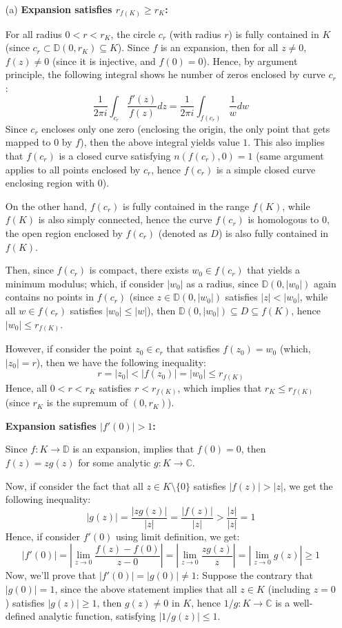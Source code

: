 \documentclass{article}
\begin{document}
\begin{itemize}
    \item[(a)] \textbf{Expansion satisfies $r_{f(K)}\geq r_K$:}
    
    For all radius $0<r<r_K$, the circle $c_r$ (with radius $r$) is fully contained in $K$ (since $c_r\subset \mathbb{D}(0,r_K)\subseteq K$).
    Since $f$ is an expansion, then for all $z\neq 0$, $f(z)\neq 0$ (since it is injective, and $f(0)=0$). Hence, by argument principle,
    the following integral shows he number of zeros enclosed by curve $c_r$:
    $$\frac{1}{2\pi i}\int_{c_r}\frac{f'(z)}{f(z)}dz = \frac{1}{2\pi i}\int_{f(c_r)}\frac{1}{w}dw$$
    Since $c_r$ encloses only one zero (enclosing the origin, the only point that gets mapped to $0$ by $f$), then the above integral yields value $1$.
    This also implies that $f(c_r)$ is a closed curve satisfying $n(f(c_r),0)=1$ (same argument applies to all points enclosed by $c_r$, hence $f(c_r)$ is a simple closed curve enclosing region with $0$).

    On the other hand, $f(c_r)$ is fully contained in the range $f(K)$, while $f(K)$ is also simply connected, hence the curve $f(c_r)$ is homologous to $0$,
    the open region enclosed by $f(c_r)$ (denoted as $D$) is also fully contained in $f(K)$.

    Then, since $f(c_r)$ is compact, there exists $w_0\in f(c_r)$ that yields a minimum modulus; which, if consider $|w_0|$ as a radius, since $\mathbb{D}(0,|w_0|)$ again contains no points in $f(c_r)$ (since $z\in \mathbb{D}(0,|w_0|)$ satisfies $|z|<|w_0|$, while all $w\in f(c_r)$ satisfies $|w_0|\leq |w|$),
    then $\mathbb{D}(0,|w_0|)\subseteq D \subseteq f(K)$, hence $|w_0|\leq r_{f(K)}$.

    However, if consider the point $z_0\in c_r$ that satisfies $f(z_0)=w_0$ (which, $|z_0|=r$), then we have the following inequality:
    $$r=|z_0|<|f(z_0)|=|w_0|\leq r_{f(K)}$$
    Hence, all $0<r<r_K$ satisfies $r<r_{f(K)}$, which implies that $r_K\leq r_{f(K)}$ (since $r_K$ is the supremum of $(0,r_K)$).

    \textbf{Expansion satisfies $|f'(0)|>1$:}

    Since $f:K\rightarrow\mathbb{D}$ is an expansion, implies that $f(0)=0$, then $f(z)=zg(z)$ for some analytic $g:K\rightarrow\mathbb{C}$.

    Now, if consider the fact that all $z\in K\setminus\{0\}$ satisfies $|f(z)|>|z|$, we get the following inequality:
    $$|g(z)|=\frac{|zg(z)|}{|z|}=\frac{|f(z)|}{|z|} > \frac{|z|}{|z|}=1$$
    Hence, if consider $f'(0)$ using limit definition, we get:
    $$|f'(0)|=\left|\lim_{z\rightarrow 0}\frac{f(z)-f(0)}{z-0}\right|=\left|\lim_{z\rightarrow 0}\frac{zg(z)}{z}\right|=|\lim_{z\rightarrow 0}g(z)| \geq 1$$
    Now, we'll prove that $|f'(0)|=|g(0)|\neq 1$: Suppose the contrary that $|g(0)|=1$, since the above statement implies that all $z\in K$ (including $z=0$) satisfies $|g(z)|\geq 1$, then $g(z)\neq 0$ in $K$, hence $1/g:K\rightarrow\mathbb{C}$ is a well-defined analytic function, satisfying $|1/g(z)|\leq 1$.


\end{itemize}
\end{document}

